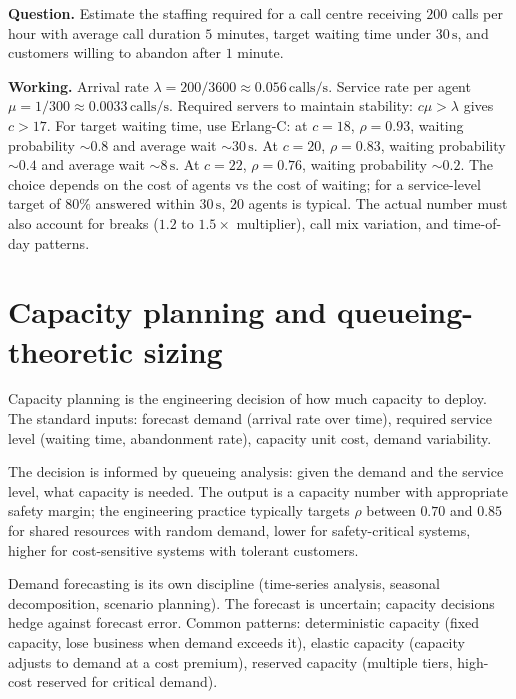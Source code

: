 \begin{estimation}
\textbf{Question.} Estimate the staffing required for a call centre receiving $200$ calls per hour with average call duration $5$ minutes, target waiting time under $30\,\text{s}$, and customers willing to abandon after $1$ minute.

\textbf{Working.} Arrival rate $\lambda = 200/3600 \approx 0.056\,\text{calls/s}$. Service rate per agent $\mu = 1/300 \approx 0.0033\,\text{calls/s}$. Required servers to maintain stability: $c\mu > \lambda$ gives $c > 17$. For target waiting time, use Erlang-C: at $c = 18$, $\rho = 0.93$, waiting probability $\sim 0.8$ and average wait $\sim 30\,\text{s}$. At $c = 20$, $\rho = 0.83$, waiting probability $\sim 0.4$ and average wait $\sim 8\,\text{s}$. At $c = 22$, $\rho = 0.76$, waiting probability $\sim 0.2$. The choice depends on the cost of agents vs the cost of waiting; for a service-level target of $80\%$ answered within $30\,\text{s}$, $20$ agents is typical. The actual number must also account for breaks ($1.2$ to $1.5\times$ multiplier), call mix variation, and time-of-day patterns.
\end{estimation}

\section{Capacity planning and queueing-theoretic sizing}

Capacity planning is the engineering decision of how much capacity to deploy. The standard inputs: forecast demand (arrival rate over time), required service level (waiting time, abandonment rate), capacity unit cost, demand variability.

The decision is informed by queueing analysis: given the demand and the service level, what capacity is needed. The output is a capacity number with appropriate safety margin; the engineering practice typically targets $\rho$ between $0.70$ and $0.85$ for shared resources with random demand, lower for safety-critical systems, higher for cost-sensitive systems with tolerant customers.

Demand forecasting is its own discipline (time-series analysis, seasonal decomposition, scenario planning). The forecast is uncertain; capacity decisions hedge against forecast error. Common patterns: deterministic capacity (fixed capacity, lose business when demand exceeds it), elastic capacity (capacity adjusts to demand at a cost premium), reserved capacity (multiple tiers, high-cost reserved for critical demand).

